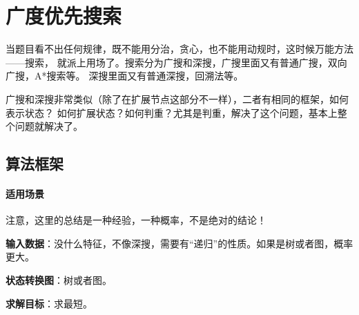 \chapter{广度优先搜索}
当题目看不出任何规律，既不能用分治，贪心，也不能用动规时，这时候万能方法——搜索，
就派上用场了。搜索分为广搜和深搜，广搜里面又有普通广搜，双向广搜，A*搜索等。
深搜里面又有普通深搜，回溯法等。

广搜和深搜非常类似（除了在扩展节点这部分不一样），二者有相同的框架，如何表示状态？
如何扩展状态？如何判重？尤其是判重，解决了这个问题，基本上整个问题就解决了。


\section{算法框架} %
\label{sec:bfs-template}


\subsubsection{适用场景}
注意，这里的总结是一种经验，一种概率，不是绝对的结论！

\textbf{输入数据}：没什么特征，不像深搜，需要有“递归”的性质。如果是树或者图，概率更大。

\textbf{状态转换图}：树或者图。

\textbf{求解目标}：求最短。


